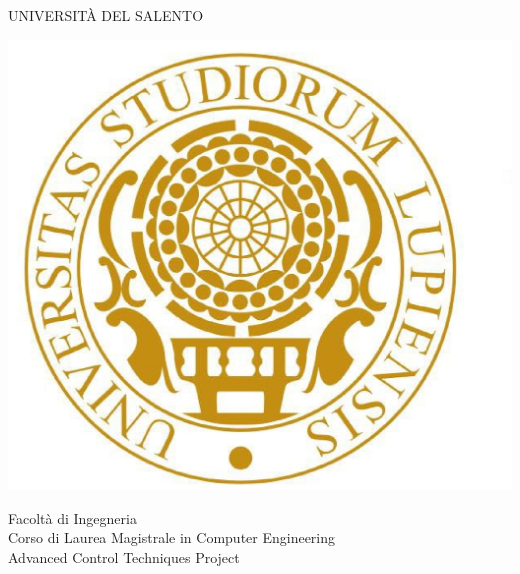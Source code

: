 \thispagestyle{empty}                                                 
\begin{center}                                                            
    \vspace{5mm}                                                           
 {\LARGE UNIVERSIT\`A DEL SALENTO} \\                       
      \vspace{5mm}
\end{center}
\begin{center}
{\includegraphics[scale=.20]{figs/logo_unisalento}}      
\end{center}
\begin{center}
      \vspace{5mm}
      {\LARGE Facolt\`a di Ingegneria} \\
        \vspace{3mm}
      {\Large Corso di Laurea Magistrale in Computer Engineering} \\
      \vspace{20mm}
      {\LARGE Advanced Control Techniques Project} \\
      \vspace{15mm}
\end{center}
